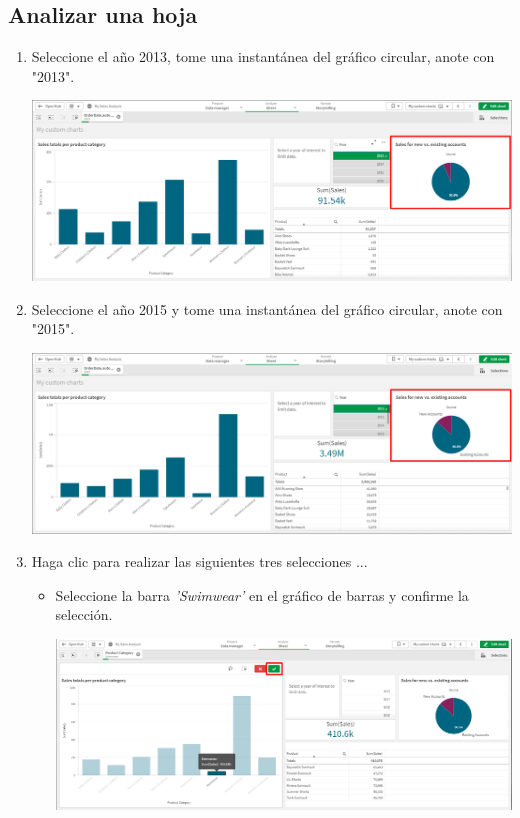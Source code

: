 \documentclass[12pt,letterpaper]{article}
\newcommand\tab[1][1cm]{\hspace*{#1}}
\begin{document}
    \subsection{Analizar una hoja}
    \begin{enumerate}[\tab 1.]
        \item Seleccione el año 2013, tome una instantánea del gráfico circular, anote con "2013".
        \begin{center}
            \includegraphics[width=13cm]{./img/img37.png}
        \end{center}
        \item Seleccione el año 2015 y tome una instantánea del gráfico circular, anote con "2015".
        \begin{center}
            \includegraphics[width=13cm]{./img/img38.png}
        \end{center}
        \item Haga clic para realizar las siguientes tres selecciones ...
        \begin{itemize}
            \item Seleccione la barra \textit{'Swimwear'} en el gráfico de barras y confirme la selección.
            \begin{center}
                \includegraphics[width=13cm]{./img/img39.1.png}

\end{center}
\end{itemize}
\end{enumerate}
\end{document}
